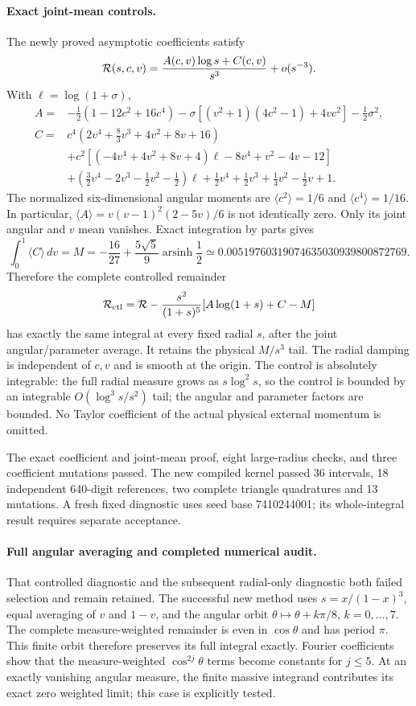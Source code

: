 \documentclass[11pt]{article}
\begin{document}
\paragraph{Exact joint-mean controls.}
The newly proved asymptotic coefficients satisfy
\[
 {\cal R}(s,c,v)=\frac{A(c,v)\log s+C(c,v)}{s^3}+o(s^{-3}).
\]
With $\ell=\log(1+\sigma)$,
\begin{align*}
 A={}&-\tfrac12(1-12c^2+16c^4)
       -\sigma[(v^2+1)(4c^2-1)+4vc^2]-\tfrac12\sigma^2,\\
 C={}&c^4(2v^4+\tfrac83v^3+4v^2+8v+16)\\
 &+c^2[(-4v^4+4v^2+8v+4)\ell-8v^4+v^2-4v-12]\\
 &+(\tfrac32v^4-2v^3-\tfrac12v^2-\tfrac12)\ell
       +\tfrac12v^4+\tfrac12v^3+\tfrac14v^2-\tfrac12v+1.
\end{align*}
The normalized six-dimensional angular moments are
$\langle c^2\rangle=1/6$ and $\langle c^4\rangle=1/16$.
In particular, $\langle A\rangle=v(v-1)^2(2-5v)/6$ is not
identically zero. Only its joint angular and $v$ mean vanishes.
Exact integration by parts gives
\[
 \int_0^1\langle C\rangle\,dv
 =M=-\frac{16}{27}+\frac{5\sqrt5}{9}\operatorname{arsinh}\frac12
 \simeq0.00519760319074635030939800872769.
\]
Therefore the complete controlled remainder
\[
 {\cal R}_{\rm ctl}={\cal R}
 -\frac{s^2}{(1+s)^5}[A\log(1+s)+C-M]
\]
has exactly the same integral at every fixed radial $s$, after the
joint angular/parameter average. It retains the physical $M/s^3$ tail.
The radial damping is independent of $c,v$ and is smooth at the origin.
The control is absolutely integrable: the full radial measure grows
as $s\log^2s$, so the control is bounded by an integrable
$O(\log^3s/s^2)$ tail; the angular and parameter factors are bounded.
No Taylor coefficient of the actual physical external momentum is omitted.

The exact coefficient and joint-mean proof, eight large-radius checks,
and three coefficient mutations passed. The new compiled kernel passed
36 intervals, 18 independent 640-digit references, two complete
triangle quadratures and 13 mutations. A fresh fixed diagnostic uses
seed base 7410244001; its whole-integral result requires separate acceptance.
\paragraph{Full angular averaging and completed numerical audit.}
That controlled diagnostic and the subsequent radial-only diagnostic
both failed selection and remain retained. The successful new method
uses $s=x/(1-x)^3$, equal averaging of $v$ and $1-v$, and the angular
orbit $\theta\mapsto\theta+k\pi/8$, $k=0,\ldots,7$.
The complete measure-weighted remainder is even in $\cos\theta$ and
has period $\pi$. This finite orbit therefore preserves its full
integral exactly. Fourier coefficients show that the measure-weighted
$\cos^{2j}\theta$ terms become constants for $j\leq5$.
At an exactly vanishing angular measure, the finite massive integrand
contributes its exact zero weighted limit; this case is explicitly tested.
\end{document}
